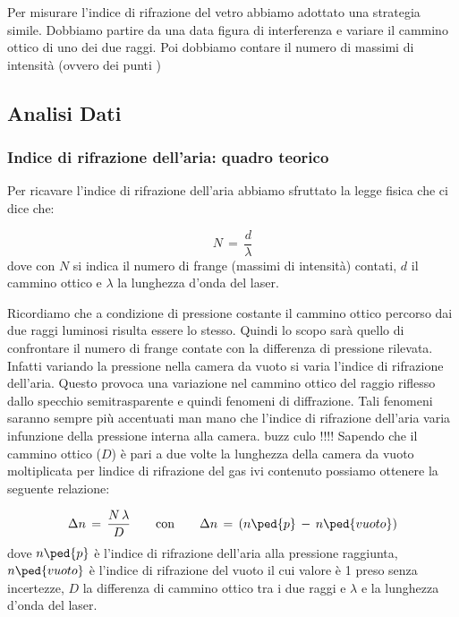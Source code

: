 Per misurare l'indice di rifrazione del vetro abbiamo adottato una strategia simile. Dobbiamo partire da una data figura di interferenza e variare il cammino ottico di uno dei due raggi. Poi dobbiamo contare il numero di massimi di intensità (ovvero dei punti )

\subsection{Analisi Dati}

\subsubsection{Indice di rifrazione dell'aria: quadro teorico}

Per ricavare l'indice di rifrazione dell'aria abbiamo sfruttato la legge fisica che ci dice che:


\begin{equation}
	N \,=\, \frac{d}{\lambda}
\end{equation}
%
dove con $N$  si indica il numero di frange (massimi di intensità) contati, $d$ il cammino ottico e $\lambda$ la lunghezza d'onda del laser.

Ricordiamo che a condizione di pressione costante il cammino ottico percorso dai due raggi luminosi risulta essere lo stesso.
Quindi lo scopo sarà quello di confrontare il numero di frange contate con la differenza di pressione rilevata. Infatti variando la pressione nella camera da vuoto si varia l'indice di rifrazione dell'aria. Questo provoca una variazione nel cammino ottico del raggio riflesso dallo specchio semitrasparente e quindi fenomeni di diffrazione. Tali fenomeni saranno sempre più accentuati man mano che l'indice di rifrazione dell'aria varia infunzione della pressione interna alla camera. buzz culo !!!!
Sapendo che il cammino ottico ($D$) è pari a due volte la lunghezza della camera da vuoto moltiplicata per lindice di rifrazione del gas ivi contenuto possiamo ottenere la seguente relazione:

\begin{equation}
	\Delta{n} \,=\, \frac{N \, \lambda}{D} \qquad \text{con} \qquad \Delta{n} \,=\, (n\ped{p} \,-\, n\ped{vuoto})
	\label{eq:delta_n}
\end{equation}
%
dove $n\ped{p}$ è l'indice di rifrazione dell'aria alla pressione raggiunta, $n\ped{vuoto}$ è l'indice di rifrazione del vuoto il cui valore è 1 preso senza incertezze, $D$ la differenza di cammino ottico tra i due raggi e $\lambda$ e la lunghezza d'onda del laser.

